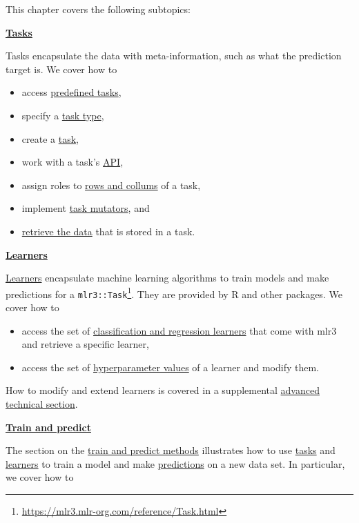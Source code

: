 \documentclass[12pt,]{scrbook}
\providecommand{\tightlist}{%
  \setlength{\itemsep}{0pt}\setlength{\parskip}{0pt}}
\renewcommand{\href}[2]{#2\footnote{\url{#1}}}
\begin{document}
This chapter covers the following subtopics:

\protect\hyperlink{tasks}{\textbf{Tasks}}

Tasks encapsulate the data with meta-information, such as what the prediction target is.
We cover how to

\begin{itemize}
\tightlist
\item
  access \protect\hyperlink{tasks-predefined}{predefined tasks},
\item
  specify a \protect\hyperlink{tasks-types}{task type},
\item
  create a \protect\hyperlink{tasks-creation}{task},
\item
  work with a task's \protect\hyperlink{tasks-api}{API},
\item
  assign roles to \protect\hyperlink{tasks-roles}{rows and collums} of a task,
\item
  implement \protect\hyperlink{tasks-mutators}{task mutators}, and
\item
  \protect\hyperlink{tasks-retrieved}{retrieve the data} that is stored in a task.
\end{itemize}

\protect\hyperlink{learners}{\textbf{Learners}}

\protect\hyperlink{learners}{Learners} encapsulate machine learning algorithms to train models and make predictions for a \href{https://mlr3.mlr-org.com/reference/Task.html}{\texttt{mlr3::Task}}.
They are provided by R and other packages.
We cover how to

\begin{itemize}
\tightlist
\item
  access the set of \protect\hyperlink{learners-predefined}{classification and regression learners} that come with mlr3 and retrieve a specific learner,
\item
  access the set of \protect\hyperlink{learners-predefined}{hyperparameter values} of a learner and modify them.
\end{itemize}

How to modify and extend learners is covered in a supplemental \protect\hyperlink{ext-learner}{advanced technical section}.

\protect\hyperlink{train-predict}{\textbf{Train and predict}}

The section on the \protect\hyperlink{train-predict}{train and predict methods} illustrates how to use \protect\hyperlink{tasks}{tasks} and \protect\hyperlink{learners}{learners} to train a model and make \protect\hyperlink{predicting}{predictions} on a new data set.
In particular, we cover how to
\end{document}
